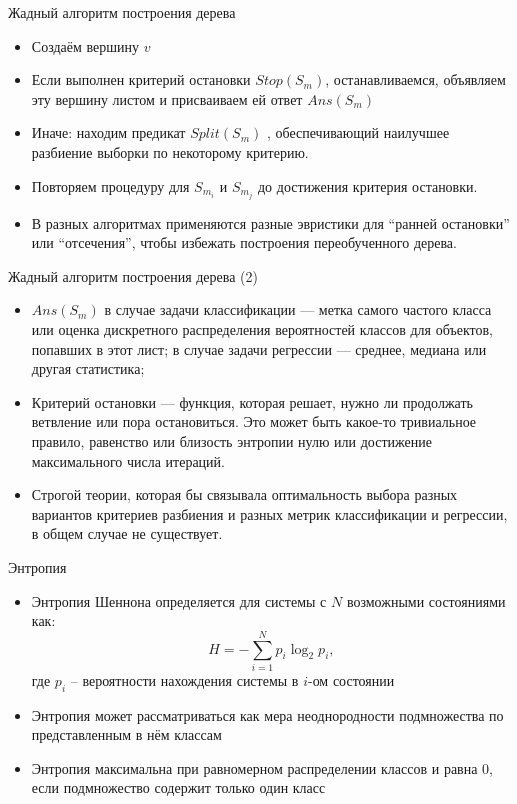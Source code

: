 \documentclass{beamer}
\begin{document}
\begin{frame}{Жадный алгоритм построения дерева}
    \small
    \begin{itemize}
        \item Создаём вершину $v$
        \item Если выполнен критерий остановки $Stop(S_m)$, останавливаемся, объявляем эту вершину листом и присваиваем ей ответ $Ans(S_m)$
        \item Иначе: находим предикат $Split(S_m)$ , обеспечивающий наилучшее разбиение выборки по некоторому критерию.
        \item Повторяем процедуру для $S_{m_i}$ и $S_{m_j}$ до достижения критерия остановки.
        \item В разных алгоритмах применяются разные эвристики для ``ранней остановки'' или ``отсечения'', чтобы избежать построения переобученного дерева.
    \end{itemize}
\end{frame}

\begin{frame}{Жадный алгоритм построения дерева (2) }
    \small

    \begin{itemize}
        \item  $Ans(S_m)$ в случае задачи классификации — метка самого частого класса или оценка дискретного распределения вероятностей классов для объектов, попавших в этот лист; в случае задачи регрессии — среднее, медиана или другая статистика;
        \item Критерий остановки  — функция, которая решает, нужно ли продолжать ветвление или пора остановиться. Это может быть какое-то тривиальное правило, равенство или близость энтропии нулю или достижение максимального числа итераций.
        \item Строгой теории, которая бы связывала оптимальность выбора разных вариантов критериев разбиения и разных метрик классификации и регрессии, в общем случае не существует.
    \end{itemize}
\end{frame}

\begin{frame}{Энтропия}
    \small

    \begin{itemize}
        \item Энтропия Шеннона определяется для системы с $N$ возможными состояниями как:
        \begin{equation}
          H = - \sum_{i=1}^N p_i \log_2 {p_i},
        \end{equation}
        где $p_i$ – вероятности нахождения системы в $i$-ом состоянии
        \item Энтропия может рассматриваться как мера неоднородности подмножества по представленным в нём классам
        \item Энтропия максимальна при равномерном распределении классов и равна 0, если подмножество содержит только один класс
    \end{itemize}
\end{frame}
\end{document}

